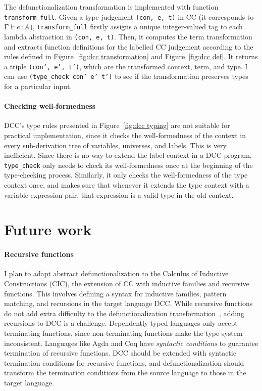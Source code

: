 The defunctionalization transformation is implemented with function \texttt{transform\_full}. Given a type judgement \texttt{(con, e, t)} in CC (it corresponds to $\Gamma \vdash e \hspace{0.5mm}{:}\hspace{0.5mm} A$), \texttt{transform\_full} firstly assigns a unique integer-valued tag to each lambda abstraction in \texttt{(con, e, t)}. Then, it computes the term transformation and extracts function definitions for the labelled CC judgement according to the rules defined in Figure~\ref{fig:dcc transformation} and Figure~\ref{fig:dcc def}. It returns a triple \texttt{(con', e', t')}, which are the transformed context, term, and type. I can use \texttt{(type\_check con' e' t')} to see if the transformation preserves types for a particular input.

\paragraph{Checking well-formedness}
DCC's type rules presented in Figure~\ref{fig:dcc typing} are not suitable for practical implementation, since it checks the well-formedness of the context in every sub-derivation tree of variables, universes, and labels. 
This is very inefficient. Since there is no way to extend the label context in a DCC program, \texttt{type\_check} only needs to check its well-formedness once at the beginning of the type-checking process. Similarly, it only checks the well-formedness of the type context once, and makes sure that whenever it extends the type context with a variable-expression pair, that expression is a valid type in the old context. 

\section{Future work}
\paragraph{Recursive functions}
I plan to adapt abstract defunctionalization to the Calculus of Inductive Constructions (CIC), the extension of CC with inductive families and recursive functions. This involves defining a syntax for inductive families, pattern matching, and recursions in the target language DCC. While recursive functions do not add extra difficulty to the defunctionalization transformation~\cite{DBLP:conf/popl/PottierG04}, adding recursions to DCC is a challenge.
Dependently-typed languages only accept terminating functions, since non-terminating functions make the type system inconsistent. Languages like Agda and Coq have \textit{syntactic conditions} to guarantee termination of recursive functions. 
DCC should be extended with syntactic termination conditions for recursive functions, and defunctionalization should transform the termination conditions from the source language to those in the target language. 
 
